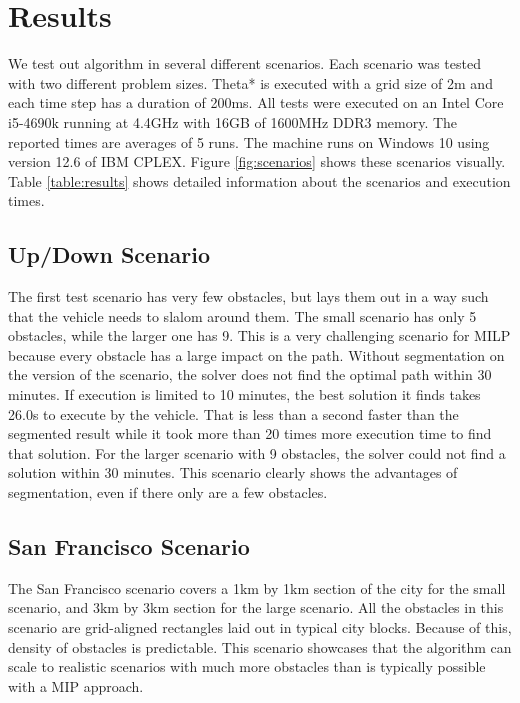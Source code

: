 \section{Results}
We test out algorithm in several different scenarios. Each scenario was tested with two different problem sizes. Theta* is executed with a grid size of 2m and each time step has a duration of 200ms. All tests were executed on an Intel Core i5-4690k running at 4.4GHz with 16GB of 1600MHz DDR3 memory. The reported times are averages of 5 runs. The machine runs on Windows 10 using version 12.6 of IBM CPLEX. Figure \ref{fig:scenarios} shows these scenarios visually. Table \ref{table:results} shows detailed information about the scenarios and execution times.

\subsection{Up/Down Scenario}
The first test scenario has very few obstacles, but lays them out in a way such that the vehicle needs to slalom around them. The small scenario has only 5 obstacles, while the larger one has 9. This is a very challenging scenario for MILP because every obstacle has a large impact on the path. Without segmentation on the version of the scenario, the solver does not find the optimal path within 30 minutes. If execution is limited to 10 minutes, the best solution it finds takes 26.0s to execute by the vehicle. That is less than a second faster than the segmented result while it took more than 20 times more execution time to find that solution. For the larger scenario with 9 obstacles, the solver could not find a solution within 30 minutes. This scenario clearly shows the advantages of segmentation, even if there only are a few obstacles.

\subsection{San Francisco Scenario}
The San Francisco scenario covers a 1km by 1km section of the city for the small scenario, and 3km by 3km section for the large scenario. All the obstacles in this scenario are grid-aligned rectangles laid out in typical city blocks. Because of this, density of obstacles is predictable. This scenario showcases that the algorithm can scale to realistic scenarios with much more obstacles than is typically possible with a MIP approach. 

